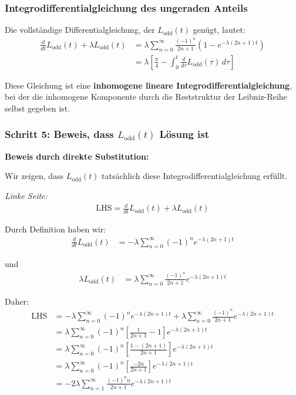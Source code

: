 \documentclass[a4paper,12pt,twoside]{report}
\theoremstyle{definition}
\begin{document}
\subsubsection*{Integrodifferentialgleichung des ungeraden Anteils}

Die vollständige Differentialgleichung, der $L_{\text{odd}}(t)$ genügt, lautet:
\begin{align}
	\frac{d}{dt} L_{\text{odd}}(t) + \lambda L_{\text{odd}}(t) &= \lambda \sum_{n=0}^{\infty} \frac{(-1)^n}{2n+1} \left( 1 - e^{-\lambda(2n+1)t} \right) \\
	&= \lambda \left[ \frac{\pi}{4} - \int_0^t \frac{d}{d\tau} L_{\text{odd}}(\tau) \, d\tau \right]
\end{align}

Diese Gleichung ist eine \textbf{inhomogene lineare Integrodifferentialgleichung}, bei der die inhomogene Komponente durch die Reststruktur der Leibniz-Reihe selbst gegeben ist.

\subsubsection*{Schritt 5: Beweis, dass $L_{\text{odd}}(t)$ Lösung ist}

\textbf{Beweis durch direkte Substitution:}

Wir zeigen, dass $L_{\text{odd}}(t)$ tatsächlich diese Integrodifferentialgleichung erfüllt.

\textit{Linke Seite:}
\begin{align}
	\text{LHS} = \frac{d}{dt} L_{\text{odd}}(t) + \lambda L_{\text{odd}}(t)
\end{align}

Durch Definition haben wir:
\begin{align}
	\frac{d}{dt} L_{\text{odd}}(t) &= -\lambda \sum_{n=0}^{\infty} (-1)^n e^{-\lambda(2n+1)t}
\end{align}

und
\begin{align}
	\lambda L_{\text{odd}}(t) &= \lambda \sum_{n=0}^{\infty} \frac{(-1)^n}{2n+1} e^{-\lambda(2n+1)t}
\end{align}

Daher:
\begin{align}
	\text{LHS} &= -\lambda \sum_{n=0}^{\infty} (-1)^n e^{-\lambda(2n+1)t} + \lambda \sum_{n=0}^{\infty} \frac{(-1)^n}{2n+1} e^{-\lambda(2n+1)t} \\
	&= \lambda \sum_{n=0}^{\infty} (-1)^n \left[ \frac{1}{2n+1} - 1 \right] e^{-\lambda(2n+1)t} \\
	&= \lambda \sum_{n=0}^{\infty} (-1)^n \left[ \frac{1 - (2n+1)}{2n+1} \right] e^{-\lambda(2n+1)t} \\
	&= \lambda \sum_{n=0}^{\infty} (-1)^n \left[ \frac{-2n}{2n+1} \right] e^{-\lambda(2n+1)t} \\
	&= -2\lambda \sum_{n=1}^{\infty} \frac{(-1)^n n}{2n+1} e^{-\lambda(2n+1)t}
\end{align}
\end{document}

